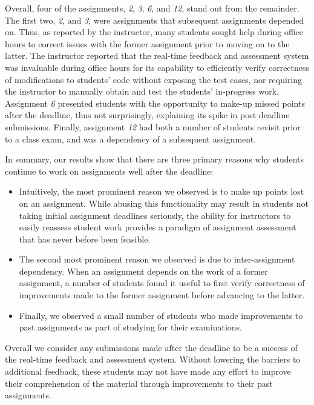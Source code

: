 Overall, four of the assignments, \emph{2}, \emph{3}, \emph{6}, and \emph{12},
stand out from the remainder. The first two, \emph{2}, and \emph{3}, were
assignments that subsequent assignments depended on. Thus, as reported by the
instructor, many students sought help during office hours to correct issues
with the former assignment prior to moving on to the latter. The instructor
reported that the real-time feedback and assessment system was invaluable
during office hours for its capability to efficiently verify correctness of
modifications to students' code without exposing the test cases, nor requiring
the instructor to manually obtain and test the students' in-progress
work. Assignment \emph{6} presented students with the opportunity to make-up
missed points after the deadline, thus not surprisingly, explaining its spike
in post deadline submissions. Finally, assignment \emph{12} had both a number
of students revisit prior to a class exam, and was a dependency of a subsequent
assignment.

In summary, our results show that there are three primary reasons why students
continue to work on assignments well after the deadline:

\begin{itemize}
\item Intuitively, the most prominent reason we observed is to make up points
  lost on an assignment. While abusing this functionality may result in
  students not taking initial assignment deadlines seriously, the ability for
  instructors to easily reassess student work provides a paradigm of assignment
  assessment that has never before been feasible.
\item The second most prominent reason we observed is due to inter-assignment
  dependency. When an assignment depends on the work of a former assignment, a
  number of students found it useful to first verify correctness of
  improvements made to the former assignment before advancing to the latter.
\item Finally, we observed a small number of students who made improvements to
  past assignments as part of studying for their examinations.
\end{itemize}

Overall we consider any submissions made after the deadline to be a success of
the real-time feedback and assessment system. Without lowering the barriers to
additional feedback, these students may not have made any effort to improve
their comprehension of the material through improvements to their past
assignments.

